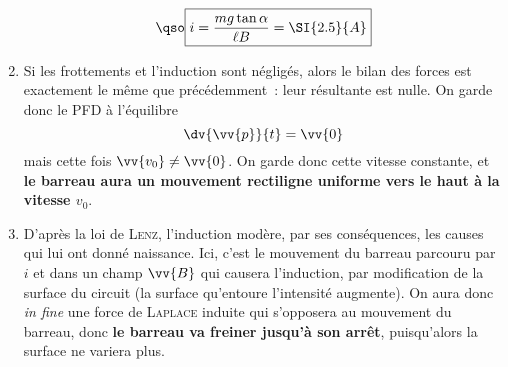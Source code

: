 \documentclass[a4paper, 11pt, final, garamond]{book}
\begin{document}
\begin{enumerate}
\[      \qso
      \boxed{i = \frac{mg \tan{\alpha}}{\ell B} = \SI{2.5}{A}}
    \]
  \item Si les frottements et l'induction sont négligés, alors le bilan des
    forces est exactement le même que précédemment~: leur résultante est nulle.
    On garde donc le PFD à l'équilibre
    \[
      \dv{\vv{p}}{t} = \vv{0}
    \]
    mais cette fois $\vv{v_0} \neq \vv{0}$. On garde donc cette vitesse
    constante, et \textbf{le barreau aura un mouvement rectiligne uniforme vers
    le haut à la vitesse $v_0$}.
  \item D'après la loi de \textsc{Lenz}, l'induction modère, par ses
    conséquences, les causes qui lui ont donné naissance.
    \smallbreak
    Ici, c'est le mouvement du barreau parcouru par $i$ et dans un champ
    $\vv{B}$ qui causera l'induction, par modification de la surface du circuit
    (la surface qu'entoure l'intensité augmente). On aura donc \textit{in fine}
    une force de \textsc{Laplace} induite qui s'opposera au mouvement du
    barreau, donc \textbf{le barreau va freiner jusqu'à son arrêt}, puisqu'alors
    la surface ne variera plus.
\end{enumerate}
\end{document}
